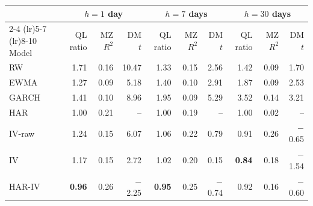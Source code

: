 \begin{tabular}{@{}lrrrrrrrrr@{}}
\toprule
 & \multicolumn{3}{c}{$h=1$ day} & \multicolumn{3}{c}{$h=7$ days} & \multicolumn{3}{c}{$h=30$ days} \\
\cmidrule(lr){2-4} \cmidrule(lr){5-7} \cmidrule(lr){8-10}
Model & QL ratio & MZ $R^2$ & DM $t$ & QL ratio & MZ $R^2$ & DM $t$ & QL ratio & MZ $R^2$ & DM $t$ \\
\midrule
RW & 1.71 & 0.16 & 10.47 & 1.33 & 0.15 & 2.56 & 1.42 & 0.09 & 1.70 \\
EWMA & 1.27 & 0.09 & 5.18 & 1.40 & 0.10 & 2.91 & 1.87 & 0.09 & 2.53 \\
GARCH & 1.41 & 0.10 & 8.96 & 1.95 & 0.09 & 5.29 & 3.52 & 0.14 & 3.21 \\
HAR & 1.00 & 0.21 & -- & 1.00 & 0.19 & -- & 1.00 & 0.02 & -- \\
IV-raw & 1.24 & 0.15 & 6.07 & 1.06 & 0.22 & 0.79 & 0.91 & 0.26 & \ensuremath{-}0.65 \\
IV & 1.17 & 0.15 & 2.72 & 1.02 & 0.20 & 0.15 & \textbf{0.84} & 0.18 & \ensuremath{-}1.54 \\
HAR-IV & \textbf{0.96} & 0.26 & \ensuremath{-}2.25 & \textbf{0.95} & 0.25 & \ensuremath{-}0.74 & 0.92 & 0.16 & \ensuremath{-}0.60 \\
\bottomrule
\end{tabular}
